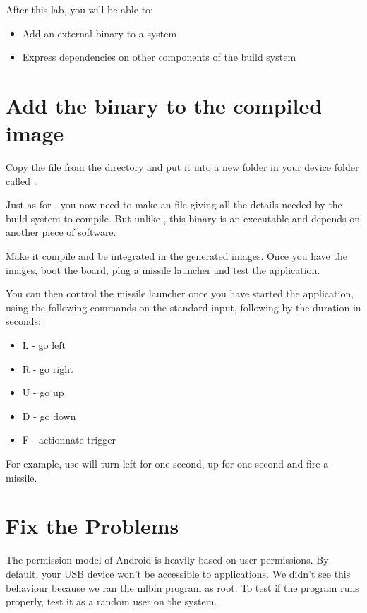 
After this lab, you will be able to:
\begin{itemize}
  \item Add an external binary to a system
  \item Express dependencies on other components of the build system
\end{itemize}

\section{Add the binary to the compiled image}
Copy the  file from the
 directory and put it into a new
folder in your device folder called .


Just as for , you now need to make an  file
giving all the details needed by the build system to compile. But
unlike , this binary is an executable and depends on another
piece of software.

Make it compile and be integrated in the generated images. Once you
have the images, boot the board, plug a missile launcher and test the
application.

You can then control the missile launcher once you have started the
 application, using the following commands on the
standard input, following by the duration in seconds:
\begin{itemize}
	\item L - go left
	\item R - go right
	\item U - go up
	\item D - go down
	\item F - actionnate trigger
\end{itemize}

For example, use  will turn left for one second, up
for one second and fire a missile.

\section{Fix the Problems}

The permission model of Android is heavily based on user
permissions. By default, your USB device won't be accessible to
applications. We didn't see this behaviour because we ran the mlbin
program as root. To test if the program runs properly, test it as a
random user on the system.

